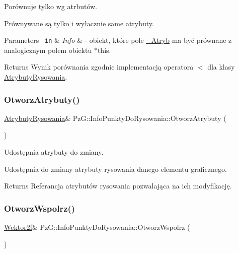 Porównuje tylko wg atrbutów. 

Prównywane są tylko i wyłacznie same atrybuty. 
\begin{DoxyParams}[1]{Parameters}
\mbox{\texttt{ in}}  & {\em Info} & -\/ obiekt, które pole \mbox{\hyperlink{}{\+\_\+\+Atryb}} ma być prównane z analogicznym polem obiektu {\ttfamily $\ast$this}. \\
\hline
\end{DoxyParams}
\begin{DoxyReturn}{Returns}
Wynik porównania zgodnie implementacją operatora \textquotesingle{}$<$\textquotesingle{} dla klasy \mbox{\hyperlink{class_pz_g_1_1_atrybuty_rysowania}{Atrybuty\+Rysowania}}. 
\end{DoxyReturn}
\mbox{\label{class_pz_g_1_1_info_punkty_do_rysowania_a93c59d4f6fa5687ceef68db7c832c10a}} 
\subsubsection{\texorpdfstring{OtworzAtrybuty()}{OtworzAtrybuty()}}
{\footnotesize\ttfamily \mbox{\hyperlink{class_pz_g_1_1_atrybuty_rysowania}{Atrybuty\+Rysowania}}\& Pz\+G\+::\+Info\+Punkty\+Do\+Rysowania\+::\+Otworz\+Atrybuty (\begin{DoxyParamCaption}{ }\end{DoxyParamCaption})\hspace{0.3cm}{\ttfamily [inline]}}



Udostępnia atrybuty do zmiany. 

Udostępnia do zmiany atrybuty rysowania danego elementu graficznego. \begin{DoxyReturn}{Returns}
Referancja atrybutów rysowania pozwalająca na ich modyfikację. 
\end{DoxyReturn}
\mbox{\label{class_pz_g_1_1_info_punkty_do_rysowania_a9a367a5b7977f3d16f2466a4d5f89a8a}} 
\subsubsection{\texorpdfstring{OtworzWspolrz()}{OtworzWspolrz()}}
{\footnotesize\ttfamily \mbox{\hyperlink{class_pz_g_1_1_wektor2f}{Wektor2f}}\& Pz\+G\+::\+Info\+Punkty\+Do\+Rysowania\+::\+Otworz\+Wspolrz (\begin{DoxyParamCaption}{ }\end{DoxyParamCaption})\hspace{0.3cm}{\ttfamily [inline]}}



